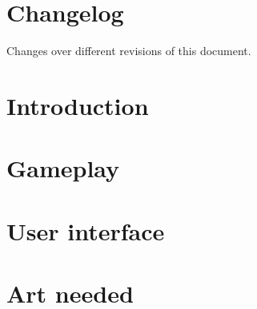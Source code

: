 \documentclass[a4paper, 11pt]{article}
\title{\titlename}
\author{\authorname}
\begin{document}


\tableofcontents
\cleardoublepage

\section{Changelog}
\label{sec:changelog} 

Changes over different revisions of this document.



\section{Introduction}
\label{sec:introduction}


\section{Gameplay}
\label{sec:gameplay}
%

\section{User interface}
\label{sec:interface}
%

\section{Art needed}
\label{sec:art}
%
\end{document}
